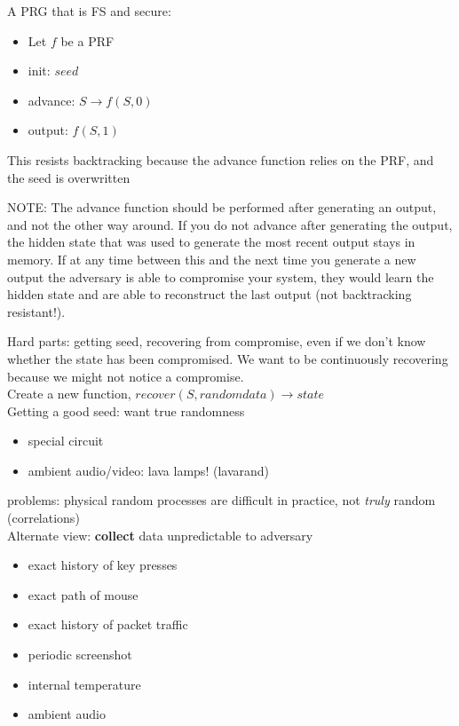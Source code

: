 \begin{example}{A PRG that is FS and secure:}
    \begin{itemize}
    \item Let $f$ be a PRF
    \item init: $seed$
    \item advance: $S \rightarrow f(S, 0)$
    \item output: $f(S, 1)$
    \end{itemize}
    This resists backtracking because the advance function relies on the PRF, and the seed is overwritten

    NOTE: The advance function should be performed after generating an output, and not the other way around. If you do not advance after generating the output, the hidden state that was used to generate the most recent output stays in memory. If at any time between this and the next time you generate a new output the adversary is able to compromise your system, they would learn the hidden state and are able to reconstruct the last output (not backtracking resistant!).
\end{example}

Hard parts: getting seed, recovering from compromise, even if we don't know whether the state has been compromised. We want to be continuously recovering because we might not notice a compromise.\\
Create a new function, $recover(S, random data) \rightarrow state$\\

Getting a good seed: want true randomness
\begin{itemize}
    \item special circuit
    \item ambient audio/video: lava lamps! (lavarand)
\end{itemize}
problems: physical random processes are difficult in practice, not \emph{truly} random (correlations)\\

Alternate view: \textbf{collect} data unpredictable to adversary
\begin{itemize}
    \item exact history of key presses
    \item exact path of mouse
    \item exact history of packet traffic
    \item periodic screenshot
    \item internal temperature
    \item ambient audio
\end{itemize}


